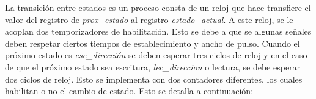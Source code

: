 %	

%
%	
%	
%	
%	
%	
%	

La transición entre estados es un proceso consta de un reloj que hace transfiere el valor del registro de \textit{prox\_estado} al registro \textit{estado\_actual}. A este reloj, se le acoplan dos temporizadores de habilitación. Esto se debe a que se algunas señales deben respetar ciertos tiempos de establecimiento y ancho de pulso\cite{Cypress2017}. Cuando el próximo estado es \textit{esc\_dirección} se deben esperar tres ciclos de reloj y en el caso de que el próximo estado sea escritura, \textit{lec\_direccion} o lectura, se debe esperar dos ciclos de reloj.
Esto se implementa con dos contadores diferentes, los cuales habilitan o no el cambio de estado. Esto se detalla a continuación:

